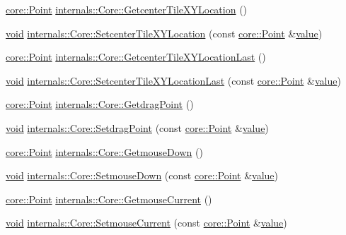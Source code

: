 \begin{DoxyCompactItemize}
\hyperlink{structcore_1_1_point}{core\-::\-Point} \hyperlink{group___o_p_map_widget_gad81fc0035925c351630e24e790d7df2d}{internals\-::\-Core\-::\-Getcenter\-Tile\-X\-Y\-Location} ()
\item 
\hyperlink{group___u_a_v_objects_plugin_ga444cf2ff3f0ecbe028adce838d373f5c}{void} \hyperlink{group___o_p_map_widget_gac19546f7c53493b741f4ffccdeb42214}{internals\-::\-Core\-::\-Setcenter\-Tile\-X\-Y\-Location} (const \hyperlink{structcore_1_1_point}{core\-::\-Point} \&\hyperlink{glext_8h_aa0e2e9cea7f208d28acda0480144beb0}{value})
\item 
\hyperlink{structcore_1_1_point}{core\-::\-Point} \hyperlink{group___o_p_map_widget_ga616220d474720ed46411357fb48ce323}{internals\-::\-Core\-::\-Getcenter\-Tile\-X\-Y\-Location\-Last} ()
\item 
\hyperlink{group___u_a_v_objects_plugin_ga444cf2ff3f0ecbe028adce838d373f5c}{void} \hyperlink{group___o_p_map_widget_ga3e20d2d38fb1001ab294401f10798932}{internals\-::\-Core\-::\-Setcenter\-Tile\-X\-Y\-Location\-Last} (const \hyperlink{structcore_1_1_point}{core\-::\-Point} \&\hyperlink{glext_8h_aa0e2e9cea7f208d28acda0480144beb0}{value})
\item 
\hyperlink{structcore_1_1_point}{core\-::\-Point} \hyperlink{group___o_p_map_widget_ga3e7f3a15092c88e62abd7ae055b83ca9}{internals\-::\-Core\-::\-Getdrag\-Point} ()
\item 
\hyperlink{group___u_a_v_objects_plugin_ga444cf2ff3f0ecbe028adce838d373f5c}{void} \hyperlink{group___o_p_map_widget_ga26fe0b642c132f54f8b89fcca245559d}{internals\-::\-Core\-::\-Setdrag\-Point} (const \hyperlink{structcore_1_1_point}{core\-::\-Point} \&\hyperlink{glext_8h_aa0e2e9cea7f208d28acda0480144beb0}{value})
\item 
\hyperlink{structcore_1_1_point}{core\-::\-Point} \hyperlink{group___o_p_map_widget_ga876eaa6494c4f0ca0a57b04aca2b63a7}{internals\-::\-Core\-::\-Getmouse\-Down} ()
\item 
\hyperlink{group___u_a_v_objects_plugin_ga444cf2ff3f0ecbe028adce838d373f5c}{void} \hyperlink{group___o_p_map_widget_ga393d5a89d61e2207a9cf54cd7a7e86db}{internals\-::\-Core\-::\-Setmouse\-Down} (const \hyperlink{structcore_1_1_point}{core\-::\-Point} \&\hyperlink{glext_8h_aa0e2e9cea7f208d28acda0480144beb0}{value})
\item 
\hyperlink{structcore_1_1_point}{core\-::\-Point} \hyperlink{group___o_p_map_widget_ga4d84ca5c68011460943e7cb0a2d9ecaa}{internals\-::\-Core\-::\-Getmouse\-Current} ()
\item 
\hyperlink{group___u_a_v_objects_plugin_ga444cf2ff3f0ecbe028adce838d373f5c}{void} \hyperlink{group___o_p_map_widget_ga5e6d344e7c74efe498222b7a343e4a80}{internals\-::\-Core\-::\-Setmouse\-Current} (const \hyperlink{structcore_1_1_point}{core\-::\-Point} \&\hyperlink{glext_8h_aa0e2e9cea7f208d28acda0480144beb0}{value})

\end{DoxyCompactItemize}
